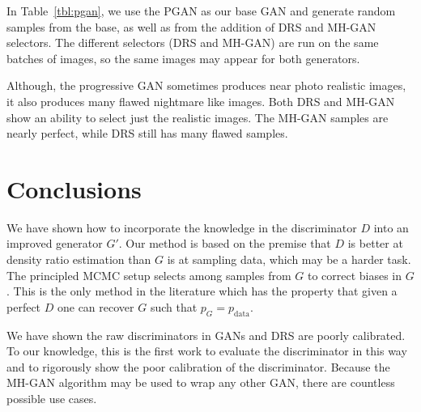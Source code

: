 \documentclass{article}
\newcommand{\PG}{{p_G}}
\newcommand{\PR}{{p_{\textrm{data}}}}
\begin{document}
In Table~\ref{tbl:pgan}, we use the PGAN as our base GAN and generate random samples from the base, as well as from the addition of DRS and MH-GAN selectors.
The different selectors (DRS and MH-GAN) are run on the same batches of images, so the same images may appear for both generators.

Although, the progressive GAN sometimes produces near photo realistic images, it also produces many flawed nightmare like images.
Both DRS and MH-GAN show an ability to select just the realistic images.
The MH-GAN samples are nearly perfect, while DRS still has many flawed samples.

\section{Conclusions}
\label{sec:conclusions}

We have shown how to incorporate the knowledge in the discriminator $D$ into an improved generator $G'$.
Our method is based on the premise that $D$ is better at density ratio estimation than $G$ is at sampling data, which may be a harder task.
The principled MCMC setup selects among samples from $G$ to correct biases in $G$.
This is the only method in the literature which has the property that given a perfect $D$ one can recover $G$ such that $\PG = \PR$.

We have shown the raw discriminators in GANs and DRS are poorly calibrated.
To our knowledge, this is the first work to evaluate the discriminator in this way and to rigorously show the poor calibration of the discriminator.
Because the MH-GAN algorithm may be used to wrap any other GAN, there are countless possible use cases.

\fboxsep=1.5pt  %
\newcommand{\unreal}[1]{\fcolorbox{white}{red}{#1}}
\end{document}
